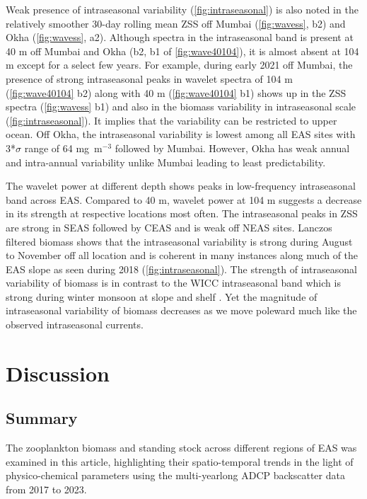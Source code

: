\documentclass{article}
\begin{document}
	Weak presence of intraseasonal variability (\cref{fig:intraseasonal}) is also noted in the relatively smoother 30-day rolling mean ZSS off Mumbai (\cref{fig:wavess}, b2) and Okha (\cref{fig:wavess}, a2). Although spectra in the intraseasonal band is present at 40 m off Mumbai and Okha (b2, b1 of \cref{fig:wave40104}), it is almost absent at 104 m  except for a select few years. For example, during early 2021 off Mumbai, the presence of strong intraseasonal peaks in wavelet spectra of 104 m (\cref{fig:wave40104} b2) along with 40 m (\cref{fig:wave40104} b1) shows up in the ZSS spectra (\cref{fig:wavess} b1) and also in the biomass variability in intraseasonal scale (\cref{fig:intraseasonal}). It implies that the variability can be restricted to upper ocean. Off Okha, the intraseasonal variability is lowest among all EAS sites with 3*$\sigma$ range of 64 mg~m$^{-3}$ followed by Mumbai. However, Okha has weak annual and intra-annual variability unlike Mumbai leading to least predictability.
	
	The wavelet power at different depth shows peaks in low-frequency intraseasonal band across EAS. Compared to 40 m, wavelet power at 104 m suggests a decrease in its strength at respective locations most often. The intraseasonal peaks in ZSS are strong in SEAS followed by CEAS and is weak off NEAS sites. Lanczos filtered biomass shows that the intraseasonal variability is strong during August to November off all location and is coherent in many instances along much of the EAS slope as seen during 2018 (\cref{fig:intraseasonal}). The strength of intraseasonal variability of biomass is in contrast to the WICC intraseasonal band which is strong during winter monsoon at slope \citep{amol2014observed, chaudhuri2020observed} and shelf \citep{chaudhuri2021observed}. Yet the magnitude of intraseasonal variability of biomass decreases as we move poleward much like the observed intraseasonal currents. 
   

	\section{Discussion}
	
	\subsection{Summary}
	The zooplankton biomass and standing stock across different regions of EAS was examined in this article, highlighting their spatio-temporal trends in the light of physico-chemical parameters using the multi-yearlong ADCP backscatter data from 2017 to 2023. 
	
\end{document}

